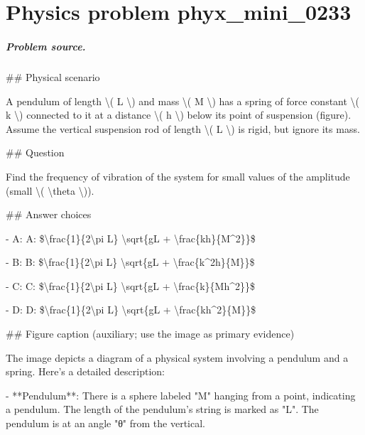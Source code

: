
\chapter{Physics problem phyx\_mini\_0233}
\label{ch:PhyXMiniProblems_problem_phyx_mini_0233}

\paragraph{Problem source.}
\#\# Physical scenario

A pendulum of length \textbackslash{}( L \textbackslash{}) and mass \textbackslash{}( M \textbackslash{}) has a spring of force constant \textbackslash{}( k \textbackslash{}) connected to it at a distance \textbackslash{}( h \textbackslash{}) below its point of suspension (figure). Assume the vertical suspension rod of length \textbackslash{}( L \textbackslash{}) is rigid, but ignore its mass.

\#\# Question

Find the frequency of vibration of the system for small values of the amplitude (small \textbackslash{}( \textbackslash{}theta \textbackslash{})).

\#\# Answer choices

- A: A: \$\textbackslash{}frac\{1\}\{2\textbackslash{}pi L\} \textbackslash{}sqrt\{gL + \textbackslash{}frac\{kh\}\{M\textasciicircum{}2\}\}\$

- B: B: \$\textbackslash{}frac\{1\}\{2\textbackslash{}pi L\} \textbackslash{}sqrt\{gL + \textbackslash{}frac\{k\textasciicircum{}2h\}\{M\}\}\$

- C: C: \$\textbackslash{}frac\{1\}\{2\textbackslash{}pi L\} \textbackslash{}sqrt\{gL + \textbackslash{}frac\{k\}\{Mh\textasciicircum{}2\}\}\$

- D: D: \$\textbackslash{}frac\{1\}\{2\textbackslash{}pi L\} \textbackslash{}sqrt\{gL + \textbackslash{}frac\{kh\textasciicircum{}2\}\{M\}\}\$

\#\# Figure caption (auxiliary; use the image as primary evidence)

The image depicts a diagram of a physical system involving a pendulum and a spring. Here's a detailed description:

- **Pendulum**: There is a sphere labeled "M" hanging from a point, indicating a pendulum. The length of the pendulum's string is marked as "L". The pendulum is at an angle "θ" from the vertical.

